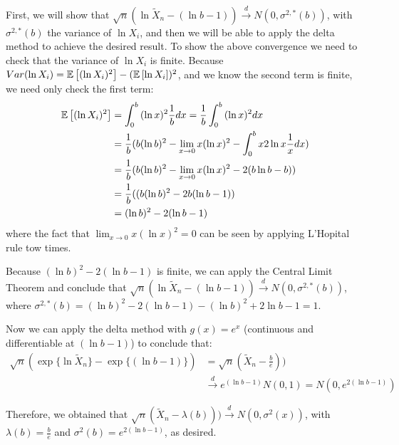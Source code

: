 \documentclass[12pt]{paper}
\begin{document}
  First, we will show that $\sqrt{n}(\ln{\tilde{X}_n}-(\ln{b}-1))\overset{d}{\to}N(0,\sigma^{2,*}(b))$, with $\sigma^{2,*}(b)$ the variance of $\ln{X_i}$, and then we will be able to apply the delta method to achieve the desired result. To show the above convergence we need to check that the variance of $\ln{X_i}$ is finite. Because $Var(\ln{X_i})=\mathbb{E} \left [ (\ln{X_i})^2 \right ]-(\mathbb{E} \left [ \ln{X_i} \right ])^2$, and we know the second term is finite, we need only check the first term:
\begin{equation}
\begin{split}
\mathbb{E} \left [ (\ln{X_i})^2 \right ]&=\int_{0}^{b}{(\ln{x})^2\frac{1}{b}dx}=\frac{1}{b}\int_{0}^{b}{(\ln{x})^2dx}\\
&=\frac{1}{b}(b(\ln{b})^2-\lim_{x\to0}{x(\ln{x})^2}-\int_{0}^{b}{x2\ln{x}\frac{1}{x}dx})\\
&=\frac{1}{b}(b(\ln{b})^2-\lim_{x\to0}{x(\ln{x})^2}-2(b\ln{b}-b))\\
&=\frac{1}{b}((b(\ln{b})^2-2b(\ln{b}-1))\\
&=(\ln{b})^2-2(\ln{b}-1)
\end{split}
\end{equation}
\noindent where the fact that $\lim_{x\to0}{x(\ln{x})^2}=0$ can be seen by applying L'Hopital rule tow times.

Because $(\ln{b})^2-2(\ln{b}-1)$ is finite, we can apply the Central Limit Theorem and conclude that $\sqrt{n}(\ln{\tilde{X}_n}-(\ln{b}-1))\overset{d}{\to}N(0,\sigma^{2,*}(b))$, where $\sigma^{2,*}(b)=(\ln{b})^2-2(\ln{b}-1)-(\ln{b})^2+2\ln{b}-1=1$.

Now we can apply the delta method with $g(x)=e^{x}$ (continuous and differentiable at $(\ln{b}-1)$) to conclude that:
\begin{equation}
\begin{split}
\sqrt{n}(\exp{\{\ln{\tilde{X}_n}\}}-\exp{\{(\ln{b}-1)\}})&=\sqrt{n}(\tilde{X}_n-\frac{b}{e}))\\
&\overset{d}{\to} e^{(\ln{b}-1)} N(0,1)=N(0,e^{2(\ln{b}-1)})
\end{split}
\end{equation}

Therefore, we obtained that $\sqrt{n}(\tilde{X}_n-\lambda(b)))\overset{d}{\to}N(0,\sigma^2(x))$, with $\lambda(b)=\frac{b}{e}$ and $\sigma^2(b)=e^{2(\ln{b}-1)}$, as desired.
\end{document}
